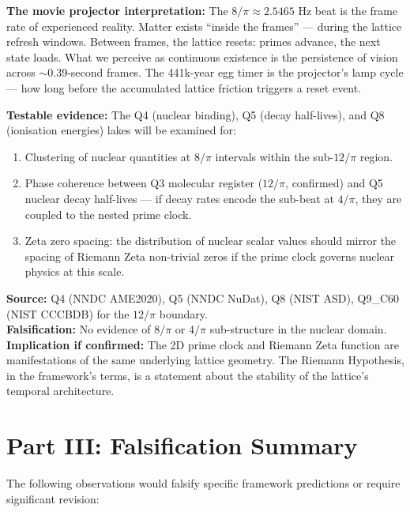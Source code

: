 \documentclass[12pt, letterpaper]{article}
\begin{document}
\medskip
\textbf{The movie projector interpretation:} The $8/\pi \approx 2.5465$ Hz
beat is the frame rate of experienced reality. Matter exists ``inside the
frames'' --- during the lattice refresh windows. Between frames, the lattice
resets: primes advance, the next state loads. What we perceive as continuous
existence is the persistence of vision across $\sim$0.39-second frames. The
441k-year egg timer is the projector's lamp cycle --- how long before the
accumulated lattice friction triggers a reset event.

\medskip
\textbf{Testable evidence:} The Q4 (nuclear binding), Q5 (decay half-lives),
and Q8 (ionisation energies) lakes will be examined for:
\begin{enumerate}
\item Clustering of nuclear quantities at $8/\pi$ intervals within the
  sub-$12/\pi$ region.
\item Phase coherence between Q3 molecular register ($12/\pi$, confirmed)
  and Q5 nuclear decay half-lives --- if decay rates encode the sub-beat
  at $4/\pi$, they are coupled to the nested prime clock.
\item Zeta zero spacing: the distribution of nuclear scalar values should
  mirror the spacing of Riemann Zeta non-trivial zeros if the prime clock
  governs nuclear physics at this scale.
\end{enumerate}

\medskip
\textbf{Source:} Q4 (NNDC AME2020), Q5 (NNDC NuDat), Q8 (NIST ASD),
Q9\_C60 (NIST CCCBDB) for the $12/\pi$ boundary.\\
\textbf{Falsification:} No evidence of $8/\pi$ or $4/\pi$ sub-structure
in the nuclear domain.\\
\textbf{Implication if confirmed:} The 2D prime clock and Riemann Zeta
function are manifestations of the same underlying lattice geometry. The
Riemann Hypothesis, in the framework's terms, is a statement about the
stability of the lattice's temporal architecture.

\newpage

\section*{Part III: Falsification Summary}

The following observations would falsify specific framework predictions or
require significant revision:
\end{document}
